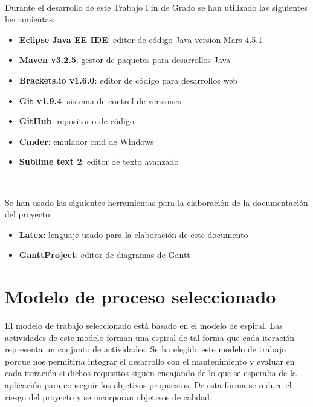        \vspace{0.7cm}
\\
\thispagestyle{empty}

Durante el desarrollo de este Trabajo Fin de Grado se han utilizado las siguientes herramientas:

\begin{itemize}
       \item {\bfseries Eclipse Java EE IDE}: editor de código Java version Mars 4.5.1
       \item {\bfseries Maven v3.2.5}: gestor de paquetes para desarrollos Java
       \item {\bfseries Brackets.io v1.6.0}: editor de código para desarrollos web
       \item {\bfseries Git v1.9.4}: sistema de control de versiones
       \item {\bfseries GitHub}: repositorio de código
       \item {\bfseries Cmder}: emulador cmd de Windows 
       \item {\bfseries Sublime text 2}: editor de texto avanzado
\end{itemize}


       \vspace{0.7cm}
\\
\thispagestyle{empty}

Se han usado las siguientes herramientas para la elaboración de la documentación del proyecto:

\begin{itemize}
       \item {\bfseries Latex}: lenguaje usado para la elaboración de este documento
       \item {\bfseries GanttProject}: editor de diagramas de Gantt
\end{itemize}


\section{Modelo de proceso seleccionado}
\thispagestyle{empty}


El modelo de trabajo seleccionado está basado en el modelo de espiral. Las actividades de este modelo forman una espiral de tal forma que cada iteración representa un conjunto de actividades. Se ha elegido este modelo de trabajo porque nos permitiría integrar el desarrollo con el mantenimiento y evaluar en cada iteración si dichos requisitos siguen encajando de lo que se esperaba de la aplicación para conseguir los objetivos propuestos. De esta forma se reduce el riesgo del proyecto y se incorporan objetivos de calidad.

